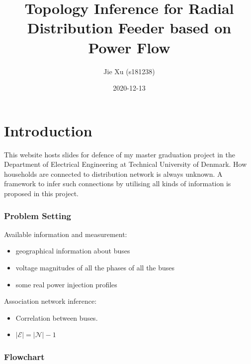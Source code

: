 \documentclass[
]{book}
\title{Topology Inference for Radial Distribution Feeder based on Power Flow}
\author{Jie Xu (s181238)}
\date{2020-12-13}
\providecommand{\tightlist}{%
  \setlength{\itemsep}{0pt}\setlength{\parskip}{0pt}}
\begin{document}
\maketitle

{
\setcounter{tocdepth}{1}
\tableofcontents
}
\hypertarget{introduction}{%
\chapter{Introduction}\label{introduction}}

This website hosts slides for defence of my master graduation project in the
Department of Electrical Engineering at Technical University of Denmark. How
households are connected to distribution network is always unknown. A framework
to infer such connections by utilising all kinds of information is proposed in
this project.

\hypertarget{problem-setting}{%
\subsection*{Problem Setting}\label{problem-setting}}

Available information and measurement:

\begin{itemize}
\tightlist
\item
  geographical information about buses
\item
  voltage magnitudes of all the phases of all the buses
\item
  some real power injection profiles
\end{itemize}

Association network inference:

\begin{itemize}
\tightlist
\item
  Correlation between buses.
\item
  \(|\mathcal{E}| = |\mathcal{N}| - 1\)
\end{itemize}

\hypertarget{flowchart}{%
\subsection*{Flowchart}\label{flowchart}}
\end{document}
